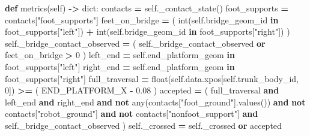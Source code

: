 \documentclass[
  american,
  11pt,
  letterpaper,
]{article}
\newenvironment{Shaded}{\begin{snugshade}}{\end{snugshade}}
\newcommand{\BuiltInTok}[1]{#1}
\newcommand{\DecValTok}[1]{\textcolor[rgb]{0.00,0.00,0.81}{#1}}
\newcommand{\FloatTok}[1]{\textcolor[rgb]{0.00,0.00,0.81}{#1}}
\newcommand{\KeywordTok}[1]{\textcolor[rgb]{0.13,0.29,0.53}{\textbf{#1}}}
\newcommand{\NormalTok}[1]{#1}
\newcommand{\OperatorTok}[1]{\textcolor[rgb]{0.81,0.36,0.00}{\textbf{#1}}}
\newcommand{\StringTok}[1]{\textcolor[rgb]{0.31,0.60,0.02}{#1}}
\newcommand{\VariableTok}[1]{\textcolor[rgb]{0.00,0.00,0.00}{#1}}
\renewenvironment{Shaded}{\par\smallskip}{\par\smallskip}
\begin{document}
\begin{Shaded}
\begin{Highlighting}[]
    \KeywordTok{def}\NormalTok{ metrics(}\VariableTok{self}\NormalTok{) }\OperatorTok{{-}\textgreater{}} \BuiltInTok{dict}\NormalTok{:}
\NormalTok{        contacts }\OperatorTok{=} \VariableTok{self}\NormalTok{.\_contact\_state()}
\NormalTok{        foot\_supports }\OperatorTok{=}\NormalTok{ contacts[}\StringTok{"foot\_supports"}\NormalTok{]}
\NormalTok{        feet\_on\_bridge }\OperatorTok{=}\NormalTok{ (}
            \BuiltInTok{int}\NormalTok{(}\VariableTok{self}\NormalTok{.bridge\_geom\_id }\KeywordTok{in}\NormalTok{ foot\_supports[}\StringTok{"left"}\NormalTok{])}
            \OperatorTok{+} \BuiltInTok{int}\NormalTok{(}\VariableTok{self}\NormalTok{.bridge\_geom\_id }\KeywordTok{in}\NormalTok{ foot\_supports[}\StringTok{"right"}\NormalTok{])}
\NormalTok{        )}
        \VariableTok{self}\NormalTok{.\_bridge\_contact\_observed }\OperatorTok{=}\NormalTok{ (}
            \VariableTok{self}\NormalTok{.\_bridge\_contact\_observed }\KeywordTok{or}\NormalTok{ feet\_on\_bridge }\OperatorTok{\textgreater{}} \DecValTok{0}
\NormalTok{        )}
\NormalTok{        left\_end }\OperatorTok{=} \VariableTok{self}\NormalTok{.end\_platform\_geom }\KeywordTok{in}\NormalTok{ foot\_supports[}\StringTok{"left"}\NormalTok{]}
\NormalTok{        right\_end }\OperatorTok{=} \VariableTok{self}\NormalTok{.end\_platform\_geom }\KeywordTok{in}\NormalTok{ foot\_supports[}\StringTok{"right"}\NormalTok{]}
\NormalTok{        full\_traversal }\OperatorTok{=} \BuiltInTok{float}\NormalTok{(}\VariableTok{self}\NormalTok{.data.xpos[}\VariableTok{self}\NormalTok{.trunk\_body\_id, }\DecValTok{0}\NormalTok{]) }\OperatorTok{\textgreater{}=}\NormalTok{ (}
\NormalTok{            END\_PLATFORM\_X }\OperatorTok{{-}} \FloatTok{0.08}
\NormalTok{        )}
\NormalTok{        accepted }\OperatorTok{=}\NormalTok{ (}
\NormalTok{            full\_traversal}
            \KeywordTok{and}\NormalTok{ left\_end}
            \KeywordTok{and}\NormalTok{ right\_end}
            \KeywordTok{and} \KeywordTok{not} \BuiltInTok{any}\NormalTok{(contacts[}\StringTok{"foot\_ground"}\NormalTok{].values())}
            \KeywordTok{and} \KeywordTok{not}\NormalTok{ contacts[}\StringTok{"robot\_ground"}\NormalTok{]}
            \KeywordTok{and} \KeywordTok{not}\NormalTok{ contacts[}\StringTok{"nonfoot\_support"}\NormalTok{]}
            \KeywordTok{and} \VariableTok{self}\NormalTok{.\_bridge\_contact\_observed}
\NormalTok{        )}
        \VariableTok{self}\NormalTok{.\_crossed }\OperatorTok{=} \VariableTok{self}\NormalTok{.\_crossed }\KeywordTok{or}\NormalTok{ accepted}


\end{Highlighting}
\end{Shaded}
\end{document}
